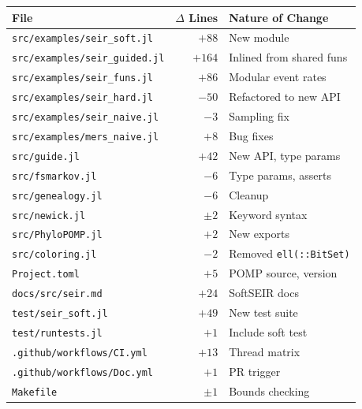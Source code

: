 \documentclass[11pt,letterpaper]{article}
\begin{document}
\begin{center}
\small
\begin{tabular}{l r l}
  \hline
  \textbf{File} & \textbf{$\Delta$ Lines} & \textbf{Nature of Change} \\
  \hline
  \texttt{src/examples/seir\_soft.jl}    & $+88$   & New module \\
  \texttt{src/examples/seir\_guided.jl}  & $+164$  & Inlined from shared funs \\
  \texttt{src/examples/seir\_funs.jl}    & $+86$   & Modular event rates \\
  \texttt{src/examples/seir\_hard.jl}    & $-50$   & Refactored to new API \\
  \texttt{src/examples/seir\_naive.jl}   & $-3$    & Sampling fix \\
  \texttt{src/examples/mers\_naive.jl}   & $+8$    & Bug fixes \\
  \texttt{src/guide.jl}                  & $+42$   & New API, type params \\
  \texttt{src/fsmarkov.jl}               & $-6$    & Type params, asserts \\
  \texttt{src/genealogy.jl}              & $-6$    & Cleanup \\
  \texttt{src/newick.jl}                 & $\pm 2$ & Keyword syntax \\
  \texttt{src/PhyloPOMP.jl}              & $+2$    & New exports \\
  \texttt{src/coloring.jl}               & $-2$    & Removed \texttt{ell(::BitSet)} \\
  \texttt{Project.toml}                  & $+5$    & POMP source, version \\
  \texttt{docs/src/seir.md}              & $+24$   & SoftSEIR docs \\
  \texttt{test/seir\_soft.jl}            & $+49$   & New test suite \\
  \texttt{test/runtests.jl}              & $+1$    & Include soft test \\
  \texttt{.github/workflows/CI.yml}      & $+13$   & Thread matrix \\
  \texttt{.github/workflows/Doc.yml}     & $+1$    & PR trigger \\
  \texttt{Makefile}                      & $\pm 1$ & Bounds checking \\
  \hline
\end{tabular}
\end{center}
\end{document}
